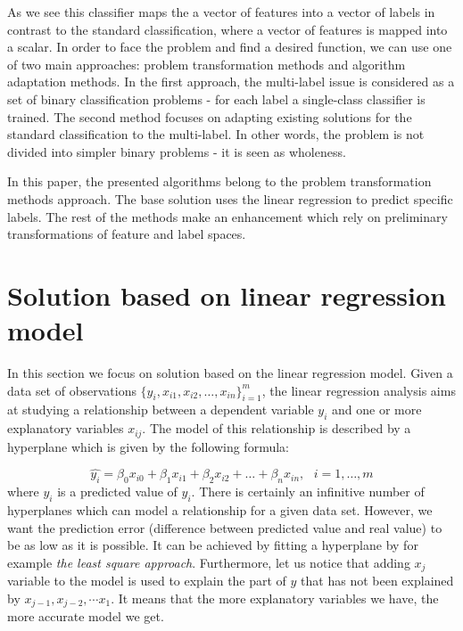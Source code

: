 As we see this classifier maps the a vector of features into a vector of labels in contrast to the standard classification, where a vector of features is mapped into a scalar. In order to face the problem and find a desired function, we can use one of two main approaches: problem transformation methods and algorithm adaptation methods. In the first approach, the multi-label issue is considered as a set of binary classification problems - for each label a single-class classifier is trained. The second method focuses on adapting existing solutions for the standard classification to the multi-label. In other words, the problem is not divided into simpler binary problems - it is seen as wholeness.

In this paper, the presented algorithms belong to the problem transformation methods approach. The base solution uses the linear regression to predict specific labels. The rest of the methods make an enhancement which rely on preliminary transformations of feature and label spaces. 

\section{Solution based on linear regression model}

In this section we focus on solution based on the linear regression model. Given a data set of observations $\{y_i, x_{i1}, x_{i2}, \dots, x_{in}\}_{i=1}^{m}$, the linear regression analysis aims at studying a relationship between a dependent variable $y_i$ and one or more explanatory variables $x_{ij}$. The model of this relationship is described by a hyperplane which is given by the following formula:

\begin{equation}\label{eq:LR1}
    \hat{y_i} = \beta_0x_{i0} + \beta_1x_{i1} + \beta_2x_{i2} + \dots + \beta_nx_{in}, \text{ } i=1, \dots, m
\end{equation}
where $\hat{y_i}$ is a predicted value of $y_i$. 
There is certainly an infinitive number of hyperplanes which can model a relationship for a given data set. However, we want the prediction error (difference between predicted value and real value) to be as low as it is possible. It can be achieved by fitting a hyperplane by for example \textit{the least square approach}. Furthermore, let us notice that adding $x_j$ variable to the model is used to explain the part of $y$ that has not been explained by $x_{j-1}, x_{j-2}, \cdots x_1$. It means that the more explanatory variables we have, the more accurate model we get.

